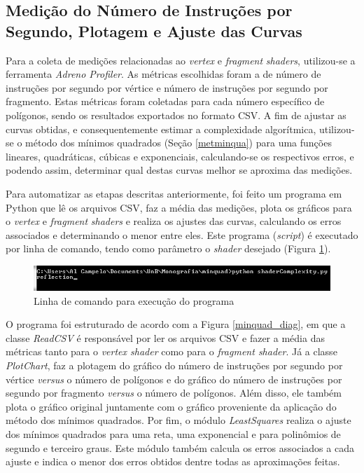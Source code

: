 \subsection{Medição do Número de Instruções por Segundo, Plotagem e Ajuste das Curvas}

	Para a coleta de medições relacionadas ao \textit{vertex} e \textit{fragment} \textit{shaders}, utilizou-se a ferramenta \textit{Adreno Profiler}. As métricas escolhidas foram a de número de instruções por segundo por vértice e número de instruções por segundo por fragmento. Estas métricas foram coletadas para cada número específico de polígonos, sendo os resultados exportados no formato CSV. A fim de ajustar as curvas obtidas, e consequentemente estimar a complexidade algorítmica, utilizou-se o método dos mínimos quadrados (Seção \ref{metminqua}) para uma funções lineares, quadráticas, cúbicas e exponenciais, calculando-se os respectivos erros, e podendo assim, determinar qual destas curvas melhor se aproxima das medições. 

	 Para automatizar as etapas descritas anteriormente, foi feito um programa em Python que lê os arquivos CSV, faz a média das medições, plota os gráficos para o \textit{vertex} e \textit{fragment} \textit{shaders} e realiza os ajustes das curvas, calculando os erros associados e determinando o menor entre eles. Este programa (\textit{script}) é executado por linha de comando, tendo como parâmetro o \textit{shader} desejado (Figura \ref{linhacomando}).

	\begin{figure}[ht]
	\centering
		\includegraphics[keepaspectratio=true,scale=0.8]{figuras/linhacomando.jpg}
	\caption{Linha de comando para execução do programa}
	\label{linhacomando}
	\end{figure}


	O programa foi estruturado de acordo com a Figura \ref{minquad_diag}, em que a classe \textit{ReadCSV} é responsável por ler os arquivos CSV e fazer a média das métricas tanto para o \textit{vertex shader} como para o \textit{fragment shader}. Já a classe \textit{PlotChart}, faz a plotagem do gráfico do número de instruções por segundo por vértice \textit{versus} o número de polígonos e do gráfico do número de instruções por segundo por fragmento \textit{versus} o número de polígonos. Além disso, ele também plota o gráfico original juntamente com o gráfico proveniente da aplicação do método dos mínimos quadrados. Por fim, o módulo \textit{LeastSquares} realiza o ajuste dos mínimos quadrados para uma reta, uma exponencial e para polinômios de segundo e terceiro graus. Este módulo também calcula os erros associados a cada ajuste e indica o menor dos erros obtidos dentre todas as aproximações feitas. 

